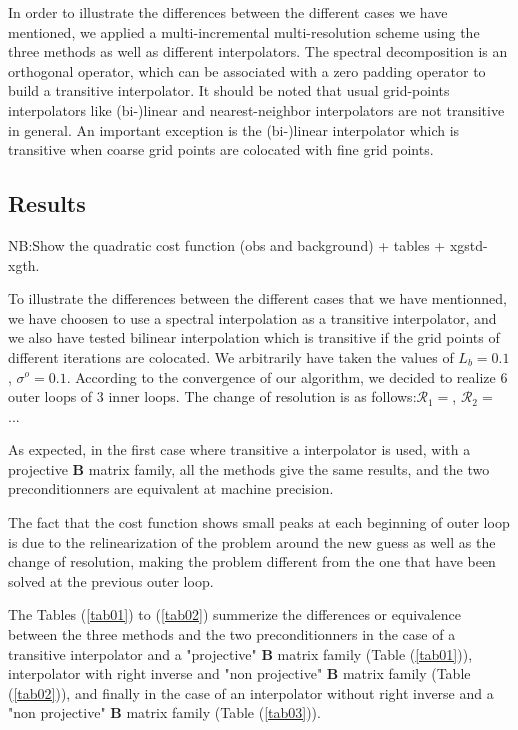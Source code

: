 \documentclass[npg, manuscript]{copernicus}
\begin{document}
In order to illustrate the differences between the different cases we have mentioned, we applied a multi-incremental multi-resolution scheme using the three methods as well as different interpolators. The spectral decomposition is an orthogonal operator, which can be associated with a zero padding operator to build a transitive interpolator. It should be noted that usual grid-points interpolators like (bi-)linear and nearest-neighbor interpolators are not transitive in general. An important exception is the (bi-)linear interpolator which is transitive when coarse grid points are colocated with fine grid points.

\subsection{Results}
NB:Show the quadratic cost function (obs and background) + tables + xgstd-xgth.

To illustrate the differences between the different cases that we have mentionned, we have choosen to use a spectral interpolation as a transitive interpolator, and we also have tested bilinear interpolation which is transitive if the grid points of different iterations are colocated. We arbitrarily have taken the values of $L_b = 0.1$, $\sigma^o=0.1$. According to the convergence of our algorithm, we decided to realize 6 outer loops of 3 inner loops. The change of resolution is as follows:$\mathcal{R}_1 = $, $\mathcal{R}_2 = $ ...

As expected, in the first case where transitive a interpolator is used, with a projective $\mathbf{B}$ matrix family, all the methods give the same results, and the two preconditionners are equivalent at machine precision.

The fact that the cost function shows small peaks at each beginning of outer loop is due to the relinearization of the problem around the new guess as well as the change of resolution, making the problem different from the one that have been solved at the previous outer loop.

The Tables (\ref{tab01}) to (\ref{tab02}) summerize the differences or equivalence between the three methods and the two preconditionners in the case of a transitive interpolator and a "projective" $\mathbf{B}$ matrix family (Table (\ref{tab01})), interpolator with right inverse and "non projective" $\mathbf{B}$ matrix family (Table (\ref{tab02})), and finally in the case of an interpolator without right inverse and a "non projective" $\mathbf{B}$ matrix family (Table (\ref{tab03})).
\end{document}
